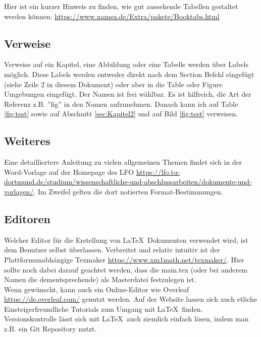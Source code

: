 Hier ist ein kurzer Hinweis zu finden, wie gut aussehende Tabellen gestaltet werden können: \url{https://www.namsu.de/Extra/pakete/Booktabs.html}


\subsection{Verweise}

Verweise auf ein Kapitel, eine Abbildung oder eine Tabelle werden über Labels möglich.
Diese Labels werden entweder direkt nach dem Section Befehl eingefügt (siehe Zeile 2 in diesem Dokument) oder aber in die Table oder Figure Umgebungen eingefügt.
Der Namen ist frei wählbar. 
Es ist hilfreich, die Art der Referenz z.B. ''fig'' in den Namen aufzunehmen.
Danach kann ich auf Table \ref{fig:test} sowie auf Abschnitt \ref{sec:Kapitel2} und auf Bild \ref{fig:test} verweisen.

\subsection{Weiteres} 
Eine detailliertere Anleitung zu vielen allgemeinen Themen findet sich in der Word-Vorlage auf der Homepage des LFO \url{https://lfo.tu-dortmund.de/studium/wissenschaftliche-und-abschlussarbeiten/dokumente-und-vorlagen/}. Im Zweifel gelten die dort notierten Format-Bestimmungen. 

\subsection{Editoren}
Welcher Editor für die Erstellung von \LaTeX\ Dokumenten verwendet wird, ist dem Benutzer selbst überlassen. Verbreitet und relativ intuitiv ist der Plattformunabhängige Texmaker \url{https://www.xm1math.net/texmaker/}. Hier sollte noch dabei darauf geachtet werden, dass die main.tex (oder bei anderem Namen die dementsprechende) als Masterdatei festzulegen ist.\\ 

Wenn gewünscht, kann auch ein Online-Editor wie Overleaf \url{https://de.overleaf.com/} genutzt werden. Auf der Website lassen sich auch etliche Einsteigerfreundliche Tutorials zum Umgang mit \LaTeX\ finden. \\

Versionskontrolle lässt sich mit \LaTeX\ auch ziemlich einfach lösen, indem man z.B. ein Git Repository nutzt.


